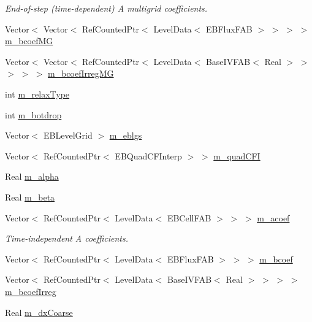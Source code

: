 \begin{DoxyCompactItemize}
\begin{DoxyCompactList}\small\item\em End-\/of-\/step (time-\/dependent) A multigrid coefficients. \end{DoxyCompactList}\item 
Vector$<$ Vector$<$ Ref\+Counted\+Ptr$<$ Level\+Data$<$ E\+B\+Flux\+F\+AB $>$ $>$ $>$ $>$ \hyperlink{classebconductivityopfactory_a477e84ef1342b8deb6f11ab6e9d7de34}{m\+\_\+bcoef\+MG}
\item 
Vector$<$ Vector$<$ Ref\+Counted\+Ptr$<$ Level\+Data$<$ Base\+I\+V\+F\+AB$<$ Real $>$ $>$ $>$ $>$ $>$ \hyperlink{classebconductivityopfactory_af604655376de3ff931775817509fe6f3}{m\+\_\+bcoef\+Irreg\+MG}
\item 
int \hyperlink{classebconductivityopfactory_af8fcc1b1b9ef706bcfd3d37f0d0a7258}{m\+\_\+relax\+Type}
\item 
int \hyperlink{classebconductivityopfactory_a1e14eecee77214710d8ec698e02189be}{m\+\_\+botdrop}
\item 
Vector$<$ E\+B\+Level\+Grid $>$ \hyperlink{classebconductivityopfactory_a665c08edd2bb8ff2c9bde58b2801b239}{m\+\_\+eblgs}
\item 
Vector$<$ Ref\+Counted\+Ptr$<$ E\+B\+Quad\+C\+F\+Interp $>$ $>$ \hyperlink{classebconductivityopfactory_a41977ee60489c87d03ed26a040869820}{m\+\_\+quad\+C\+FI}
\item 
Real \hyperlink{classebconductivityopfactory_a5eb1cba3b9bab4962dbc60c83a3da7d7}{m\+\_\+alpha}
\item 
Real \hyperlink{classebconductivityopfactory_abd680a52f1deeb0ef1ac89b0b8e0c64e}{m\+\_\+beta}
\item 
Vector$<$ Ref\+Counted\+Ptr$<$ Level\+Data$<$ E\+B\+Cell\+F\+AB $>$ $>$ $>$ \hyperlink{classebconductivityopfactory_a23f4d00bdc78370950afe18828166105}{m\+\_\+acoef}
\begin{DoxyCompactList}\small\item\em Time-\/independent A coefficients. \end{DoxyCompactList}\item 
Vector$<$ Ref\+Counted\+Ptr$<$ Level\+Data$<$ E\+B\+Flux\+F\+AB $>$ $>$ $>$ \hyperlink{classebconductivityopfactory_a5f8b23e2129e54a5a726d87610d84499}{m\+\_\+bcoef}
\item 
Vector$<$ Ref\+Counted\+Ptr$<$ Level\+Data$<$ Base\+I\+V\+F\+AB$<$ Real $>$ $>$ $>$ $>$ \hyperlink{classebconductivityopfactory_a65ca5d13540ca15c8c06e23f91b26b2d}{m\+\_\+bcoef\+Irreg}
\item 
Real \hyperlink{classebconductivityopfactory_aae199eebff435387cb02af0819293806}{m\+\_\+dx\+Coarse}

\end{DoxyCompactItemize}
